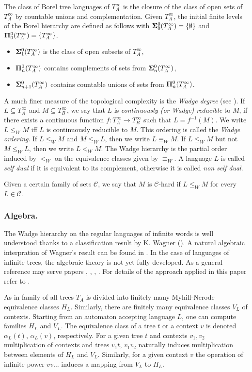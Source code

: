 The class of Borel tree languages of $T^\infty_A$ is the
closure of the class of open sets of $T^\infty_A$ by countable unions and
complementation. Given $T^\infty_A$, the initial finite levels of the
Borel hierarchy are defined as follows with ${\bf\Sigma}^0_0(T^\infty_A)= \{\emptyset\}$ and
${\bf\Pi}^0_0(T^\infty_A)=\{T^\infty_A \}$.
\begin{itemize}
\item ${\bf\Sigma}^0_1(T^\infty_A)$ is the class of open subsets of $T^\infty_A$, 
\item ${\bf\Pi}^0_n(T^\infty_A)$ contains complements of sets from ${\bf\Sigma}^0_n(T^\infty_A)$, 
\item ${\bf\Sigma}^0_{n+1}(T^\infty_A)$ contains countable unions of sets from ${\bf\Pi}^0_n(T^\infty_A)$. 
\end{itemize}

A much finer measure of the topological complexity is the \emph{Wadge degree} (see \cite[Chapter 21.E]{kechris}).
If $L \subseteq T^\infty_A$ and $M\subseteq T^\infty_B$, we say that $L$ is \emph{continuously (or Wadge)
reducible} to $M$, if there exists a continuous function $f: T^\infty_A \to T^\infty_B$ such that $L=
f^{-1}(M)$. We write $L \leq_W M$ iff $L$ is continuously reducible to $M$.
This ordering is called the {\em Wadge ordering}. If $L \leq_W M$ and $M \leq_W L$, then we write $L
\equiv_W M$. If $L \leq_W M$ but not $M \leq_W L$, then we write $L<_W
M$. The Wadge hierarchy is the partial order induced by $<_W$ on the
equivalence classes given by $\equiv_W$. A language  $L$ is called {\em self dual} if it is equivalent 
to its complement, otherwise it is called {\em non self dual}.


Given a certain family of sets $\mathcal{C}$, we say that $M$ is $\mathcal{C}$-hard if $L
\leq_W M$ for every $L \in \mathcal{C}$.   

\subsubsection*{Algebra.}
The Wadge hierarchy on the regular languages of infinite words is well understood thanks to a classification result by K. Wagner (\cite{wagner}). A natural algebraic interpration of Wagner's result can be found in \cite[Theorem 6.2]{pinperrin}. In the case of languages of infinite trees, the algebraic theory is not yet fully developed. As a general reference may serve papers \cite{blumensath}, \cite{bp}, \cite{bojtrees}, \cite{bojidziaszek}. For details of the approach applied in this paper refer to \cite[Section 3]{bp}. 

As in \cite{bp} family of all trees $T_A$ is divided into finitely many Myhill-Nerode equivalence classes $H_L$. Similarly, there are finitely many equivalence classes $V_L$ of contexts. Starting from an automaton accepting language $L$, one can compute families $H_L$ and $V_L$. The equivalence class of a tree $t$ or a context $v$ is denoted $\alpha_L(t)$, $\alpha_L(v)$, respectively. For a given tree $t$ and contexts $v_1,v_2$ multiplication of contexts and trees $v_1t$, $v_1v_2$ naturally induces multiplication between elements of $H_L$ and $V_L$. Similarly, for a given context $v$ the operation of infinite power $vv\ldots$ induces a mapping from $V_L$ to $H_L$. 



